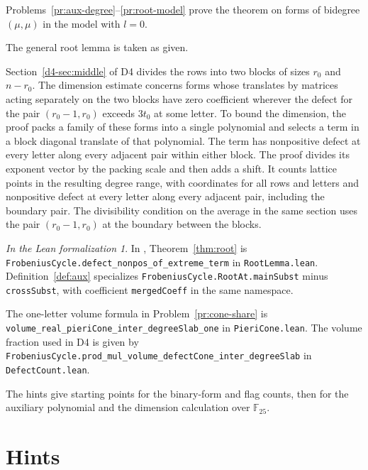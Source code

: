 \documentclass[reqno]{amsart}
\theoremstyle{plain}
\theoremstyle{definition}
\theoremstyle{remark}
\newtheorem*{leanremark}{In the Lean formalization}
\newcommand{\F}{\mathbb{F}}
\newcommand{\tl}[1]{\texttt{#1}}
\begin{document}
Problems~\ref{pr:aux-degree}--\ref{pr:root-model} prove the theorem on forms of bidegree \((\mu,\mu)\) in the model with \(l=0\).

The general root lemma is taken as given.

Section~\ref{d4-sec:middle} of D4 divides the rows into two blocks of sizes \(r_0\) and \(n-r_0\).  The dimension estimate concerns forms whose translates by matrices acting separately on the two blocks have zero coefficient wherever the defect for the pair \((r_0-1,r_0)\) exceeds \(3t_0\) at some letter.  To bound the dimension, the proof packs a family of these forms into a single polynomial and selects a term in a block diagonal translate of that polynomial.  The term has nonpositive defect at every letter along every adjacent pair within either block.  The proof divides its exponent vector by the packing scale and then adds a shift.  It counts lattice points in the resulting degree range, with coordinates for all rows and letters and nonpositive defect at every letter along every adjacent pair, including the boundary pair.  The divisibility condition on the average in the same section uses the pair \((r_0-1,r_0)\) at the boundary between the blocks.

\begin{leanremark}
\raggedright
In \cite{GL}, Theorem~\ref{thm:root} is \tl{FrobeniusCycle.\allowbreak defect\_\allowbreak nonpos\_\allowbreak of\_\allowbreak extreme\_\allowbreak term} in \tl{RootLemma.lean}.  Definition~\ref{def:aux} specializes \tl{FrobeniusCycle.\allowbreak RootAt.\allowbreak mainSubst} minus \tl{crossSubst}, with coefficient \tl{mergedCoeff} in the same namespace.

The one-letter volume formula in Problem~\ref{pr:cone-share} is \tl{volume\_\allowbreak real\_\allowbreak pieriCone\_\allowbreak inter\_\allowbreak degreeSlab\_\allowbreak one} in \tl{PieriCone.lean}.  The volume fraction used in D4 is given by \tl{FrobeniusCycle.\allowbreak prod\_\allowbreak mul\_\allowbreak volume\_\allowbreak defectCone\_\allowbreak inter\_\allowbreak degreeSlab} in \tl{DefectCount.lean}.
\end{leanremark}

The hints give starting points for the binary-form and flag counts, then for the auxiliary polynomial and the dimension calculation over \(\F_{25}\).

\section*{Hints}
\end{document}
